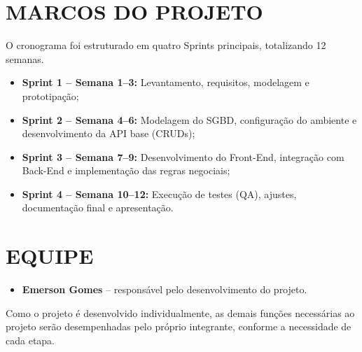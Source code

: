 \documentclass[12pt,a4paper]{article}
\begin{document}
\section*{MARCOS DO PROJETO}

O cronograma foi estruturado em quatro Sprints principais, totalizando
12 semanas.

\begin{itemize}
    \item \textbf{Sprint 1 -- Semana 1--3:} Levantamento, requisitos,
    modelagem e prototipação;
    \item \textbf{Sprint 2 -- Semana 4--6:} Modelagem do SGBD,
    configuração do ambiente e desenvolvimento da API base (CRUDs);
    \item \textbf{Sprint 3 -- Semana 7--9:} Desenvolvimento do
    Front-End, integração com Back-End e implementação das regras
    negociais;
    \item \textbf{Sprint 4 -- Semana 10--12:} Execução de testes (QA),
    ajustes, documentação final e apresentação.
\end{itemize}


\section*{EQUIPE}

\begin{itemize}
    \item \textbf{Emerson Gomes} -- responsável pelo desenvolvimento
    do projeto.
\end{itemize}

Como o projeto é desenvolvido individualmente, as demais funções
necessárias ao projeto serão desempenhadas pelo próprio integrante,
conforme a necessidade de cada etapa.
\end{document}
